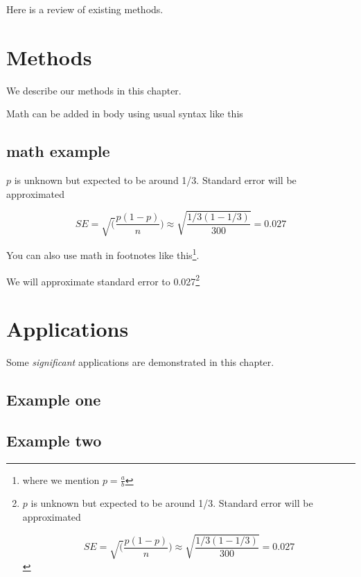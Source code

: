 \documentclass[
  openany]{book}
\begin{document}
Here is a review of existing methods.

\hypertarget{methods}{%
\chapter{Methods}\label{methods}}

We describe our methods in this chapter.

Math can be added in body using usual syntax like this

\hypertarget{math-example}{%
\section{math example}\label{math-example}}

\(p\) is unknown but expected to be around 1/3. Standard error will be approximated

\[
SE = \sqrt(\frac{p(1-p)}{n}) \approx \sqrt{\frac{1/3 (1 - 1/3)} {300}} = 0.027
\]

You can also use math in footnotes like this\footnote{where we mention \(p = \frac{a}{b}\)}.

We will approximate standard error to 0.027\footnote{\(p\) is unknown but expected to be around 1/3. Standard error will be approximated

  \[
  SE = \sqrt(\frac{p(1-p)}{n}) \approx \sqrt{\frac{1/3 (1 - 1/3)} {300}} = 0.027
  \]}

\hypertarget{applications}{%
\chapter{Applications}\label{applications}}

Some \emph{significant} applications are demonstrated in this chapter.

\hypertarget{example-one}{%
\section{Example one}\label{example-one}}

\hypertarget{example-two}{%
\section{Example two}\label{example-two}}

  
\end{document}
